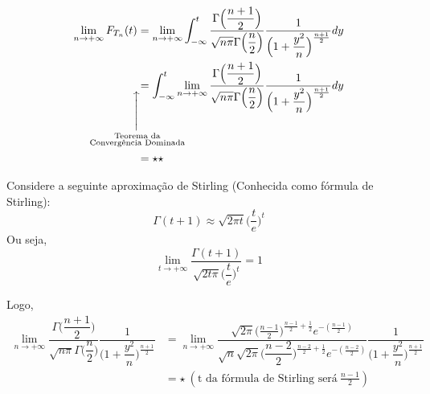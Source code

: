 \documentclass[12pt]{beamer}
\begin{document}
\begin{frame}{}
\begin{block}{}
\begin{align*}
\lim_{n\rightarrow+\infty}F_{T_{n}}(t)&=\lim_{n\rightarrow+\infty}\int_{-\infty}^{t}\dfrac{\Gamma\Big(\dfrac{n+1}{2}\Big)}{\sqrt{n\pi}\Gamma\Big(\dfrac{n}{2}\Big)}\dfrac{1}{\Big(1+\dfrac{y^{2}}{n}\Big)^{\frac{n+1}{2}}}dy\\
\underset{\mathclap{\substack{\xuparrow[30pt]\\ \text{Teorema da}\\ \text{Convergência Dominada}}}}{}&=\int_{-\infty}^{t}\lim_{n\rightarrow+\infty}\dfrac{\Gamma\Big(\dfrac{n+1}{2}\Big)}{\sqrt{n\pi}\Gamma\Big(\dfrac{n}{2}\Big)}\dfrac{1}{\Big(1+\dfrac{y^{2}}{n}\Big)^{\frac{n+1}{2}}}dy\\
&=\star\star
\end{align*}

\end{block}
\end{frame}

\begin{frame}{}
\begin{block}{}
\justifying
Considere a seguinte aproximação de Stirling (Conhecida como fórmula de Stirling): $$\Gamma(t+1)\approx \sqrt{2\pi t}\Big(\dfrac{t}{e}\Big)^{t}$$
Ou seja, $${\displaystyle \lim_{t\rightarrow+\infty} \dfrac{\Gamma(t+1)}{\sqrt{2t\pi}\Big(\dfrac{t}{e}\Big)^{t}}}=1$$
\end{block}
\pause
\begin{block}{}
Logo,
{\scriptsize
\begin{align*}
\lim_{n\rightarrow+\infty}\dfrac{\Gamma\Big(\dfrac{n+1}{2}\Big)}{\sqrt{n\pi}\Gamma\Big(\dfrac{n}{2}\Big)}\dfrac{1}{\Big(1+\dfrac{y^{2}}{n}\Big)^{\frac{n+1}{2}}}&=
\lim_{n\rightarrow+\infty}
\dfrac{\sqrt{2\pi}\Big(\frac{n-1}{2}\Big)^{\frac{n-1}{2}+\frac{1}{2}}e^{-(\frac{n-1}{2})}}{\sqrt{n}\sqrt{2\pi}\Big(\dfrac{n-2}{2}\Big)^{\frac{n-2}{2}+\frac{1}{2}}e^{-(\frac{n-2}{2})}}\dfrac{1}{\Big(1+\dfrac{y^{2}}{n}\Big)^{\frac{n+1}{2}}}\\
&=\star ~(\text{t da fórmula de Stirling será}~\frac{n-1}{2})
\end{align*}
}
\end{block}
\end{frame}
\end{document}
